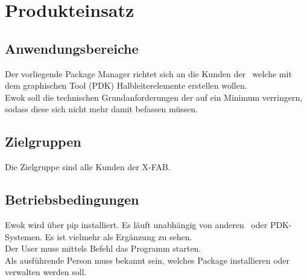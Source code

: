 \chapter{Produkteinsatz}

\section{Anwendungsbereiche}
Der vorliegende Package Manager richtet sich an die Kunden der \x~welche mit dem graphischen Tool (PDK) Halbleiterelemente erstellen wollen. \\
Ewok soll die technischen Grundanforderungen der  auf ein Minimum verringern, sodass diese sich nicht mehr damit befassen müssen.

\section{Zielgruppen}
Die Zielgruppe sind alle Kunden der X-FAB.


\section{Betriebsbedingungen}
Ewok wird über pip installiert. Es läuft unabhängig von anderen \x~oder PDK-Systemen. Es ist vielmehr als Ergänzung zu sehen.\\
Der User muss mittels Befehl das Programm starten.\\
Als ausführende Person muss bekannt sein, welches Package installieren oder verwalten werden soll.